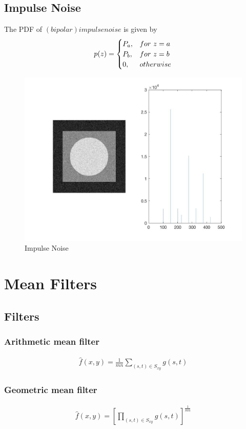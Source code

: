 \documentclass[11pt,oneside]{book}
\begin{document}
\subsection{Impulse Noise}
The PDF of $(bipolar) impulse noise$ is given by\\
\begin{eqnarray}p(z)=
\begin{cases}
P_a, &for\ z=a \cr P_b, &for\ z = b\cr 0,&otherwise\end{cases}
\end{eqnarray}
\begin{figure}[!htb]
   \centering  
   \includegraphics[width=1.0\textwidth]{images/4/impulse.jpg}
   \caption{Impulse Noise}
\end{figure}
\newpage

\section{Mean Filters}
\subsection{Filters}
\subsubsection{Arithmetic mean filter}
\begin{align}
\hat{f}(x,y)=\frac{1}{mn}\sum_{(s,t)\in S_{xy}}g(s,t)
\end{align}
\subsubsection{Geometric mean filter}
\begin{align}
\hat{f}(x,y)=[\prod_{(s,t)\in S_{xy}}g(s,t)]^{\frac{1}{mn}}
\end{align}
\end{document}
